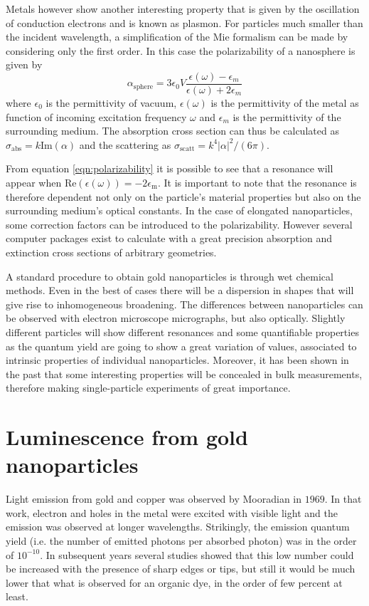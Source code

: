 Metals however show another interesting property that is given by the
oscillation of conduction electrons and is known as plasmon. For particles much
smaller than the incident wavelength, a simplification of the Mie formalism can
be made by considering only the first order. In this case the polarizability of
a nanosphere is given by
\begin{equation}\label{eqn:polarizability}
	\alpha_{\textrm{sphere}} =
	3\epsilon_0V\frac{\epsilon(\omega)-\epsilon_m}{\epsilon(\omega)+2\epsilon_m}
\end{equation}
where $\epsilon_0$ is the permittivity of vacuum, $\epsilon(\omega)$ is the
permittivity of the metal as function of incoming excitation frequency $\omega$
and $\epsilon_m$ is the permittivity of the surrounding medium. The absorption
cross section can thus be calculated as
$\sigma_\textrm{abs}=k\textrm{Im}(\alpha)$ and the scattering as
$\sigma_\textrm{scatt}=k^4|\alpha|^2/(6\pi)$.

From equation \ref{eqn:polarizability} it is possible to see that a resonance
will appear when $\textrm{Re}(\epsilon(\omega)) = -2\epsilon_\textrm{m}$. It is
important to note that the resonance is therefore dependent not only on the
particle's material properties but also on the surrounding medium's optical
constants. In the case of elongated nanoparticles, some correction factors can
be introduced to the polarizability. However several computer packages exist to
calculate with a great precision absorption and extinction cross sections of
arbitrary geometries. 

A standard procedure to obtain gold nanoparticles is through wet chemical
methods. Even in the best of cases there will be a dispersion in shapes that
will give rise to inhomogeneous broadening. The differences between
nanoparticles can be observed with electron microscope micrographs, but also
optically. Slightly different particles will show different resonances and some
quantifiable properties as the quantum yield are going to show a great variation
of values, associated to intrinsic properties of individual nanoparticles.
Moreover, it has been shown in the past that some interesting properties will be
concealed in bulk measurements, therefore making single-particle experiments of
great importance. 

\section{Luminescence from gold nanoparticles}
\label{sec:luminescence}
Light emission from gold and copper was observed by
Mooradian\cite{Mooradian1969} in $1969$. In that work, electron and holes in the
metal were excited with visible light and the emission was observed at longer
wavelengths. Strikingly, the emission quantum yield (i.e. the number of emitted
photons per absorbed photon) was in the order of $10^{-10}$. In subsequent years
several studies showed that this low number could be increased with the presence
of sharp edges or tips, but still it would be much lower that what is observed
for an organic dye, in the order of few percent at least. 

